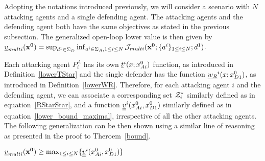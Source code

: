 Adopting the notations introduced previously, we will consider a scenario with $N$ attacking agents and a single
defending agent. The attacking agents and the defending agent both have the same objectives as stated in the previous subsection.
The generalized open-loop lower value is then given by
$\underline{v}_{multi}(\mathbf{x^0}) = \sup_{d^1 \in \Sigma_D}\inf_{a^{i}\in\Sigma_A, 1\le i \le N} \mathcal{J}_{multi}(\mathbf{x^0};\{{a^{i}}\}_{1\le i \le N};d^1)$.

Each attacking agent $P_i^A$ has its own ${\underline{t}}^{i}(x;x_{Ai}^0)$ function, as introduced in Definition~\ref{lowerTStar} and the single defender has the function
 $\underline{w_{R}}^{i}(x;x_{D1}^0)$, as introduced in Definition~\ref{lowerWR}. Therefore, for each attacking agent $i$ and the defending agent, we can associate a corresponding set
${\mathcal{Z}}^{*}_{i}$ similarly defined as in equation~\eqref{RStarStar}, and a function $\underline{\underline{v}}^{i}(x_{Ai}^0,x_{D1}^0)$ similarly defined as in equation~\eqref{lower_bound_maximal}, irrespective of 
all the other attacking agents. 
The following generalization can be then shown using a similar line of reasoning as presented in the proof to Theroem~\ref{bound}.
\begin{thm}
$\underline{v}_{multi}(\mathbf{x^0}) \ge \max_{1\le i \le N}\{\underline{\underline{v}}^{i}(x_{Ai}^0,x_{D1}^0)\}$
\end{thm}



